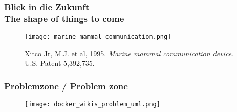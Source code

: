 \documentclass[13pt]{beamer}
\begin{document}
%
%

\begin{frame}
  \frametitle{Blick in die Zukunft \\ \textcolor{mfn_green}{The shape of things to come}}
  \begin{figure}
    \texttt{[image: marine\_mammal\_communication.png]}
    \caption{Xitco Jr, M.J. et al, 1995. \textit{Marine mammal communication device}. U.S. Patent 5,392,735.}
  \end{figure}
\end{frame}

\begin{frame}
  \frametitle{Problemzone / \textcolor{mfn_green}{Problem zone}}
  \begin{figure}
    \texttt{[image: docker\_wikis\_problem\_uml.png]}
  \end{figure}
\end{frame}
\end{document}
